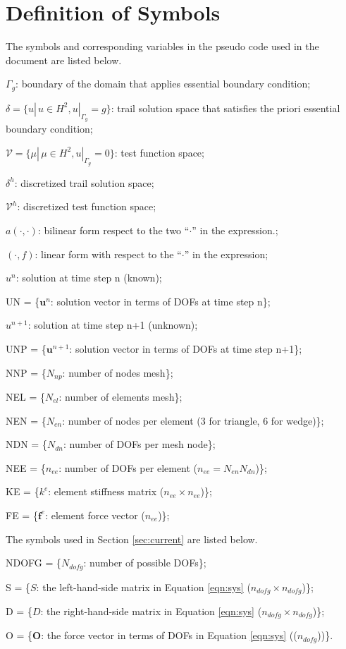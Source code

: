 \documentclass[11pt]{article}  %
\begin{document}
 \section{Definition of Symbols} \label{sec:symbs}
 The symbols and corresponding variables in the pseudo code used in the document are listed below.
 \begin{description}
 \item $\Gamma_g$:  boundary of the domain that applies essential boundary condition;
 \item $\mathcal{\delta} =\{u|\, u\in H^{2},u|_{\Gamma_g}=g\}$:  trail solution space that satisfies the priori essential boundary condition; 
 \item $\mathcal{V}=\{\mu|\, \mu\in H^{2},u|_{\Gamma_g}=0\}$:  test function space;
 \item $\mathcal{\delta}^h$: discretized trail solution space;
 \item $\mathcal{V}^h$: discretized test function space;
 \item $a(\cdot, \cdot)$: bilinear form respect to the two ``$\cdot$'' in the expression.;
 \item $(\cdot, f)$: linear form with respect to the ``$\cdot$'' in the expression;
 \item $u^{n}$: solution  at time step n (known);
 \item UN = \{$\mathbf{u}^{n}$: solution  vector in terms of DOFs at time step n\};
 \item ${u}^{n+1}$: solution  at time step n+1 (unknown);
 \item UNP = \{$\mathbf{u}^{n+1}$: solution vector in terms of DOFs at time step n+1\};
 \item NNP = \{$N_{np}$: number of nodes mesh\};
 \item NEL = \{$N_{el}$: number of elements mesh\};
 \item NEN = \{$N_{en}$: number of nodes per element (3 for triangle, 6 for wedge)\};
 \item NDN = \{$N_{dn}$: number of DOFs per mesh node\};
 \item NEE = \{$n_{ee}$: number of DOFs per element ($n_{ee}=N_{en}N_{dn}$)\};
 \item KE = \{$k^e$: element stiffness matrix ($n_{ee} \times n_{ee}$)\}; 
 \item FE = \{$\mathbf{f}^e$: element force vector  ($n_{ee}$)\};
 \end{description}
 The symbols used in Section \ref{sec:current} are listed below.
 \begin{description}
 \item NDOFG = \{$N_{dofg}$: number of possible DOFs\};
 \item S = \{$S$: the left-hand-side matrix in Equation \ref{eqn:sys} ($n_{dofg} \times n_{dofg}$)\};
 \item D = \{$D$: the right-hand-side matrix  in Equation \ref{eqn:sys} ($n_{dofg} \times n_{dofg}$)\};
 \item O = \{$\mathbf{O}$: the force vector in terms of DOFs in Equation \ref{eqn:sys} (($n_{dofg}$))\}.
 \end{description}
 
\end{document}
